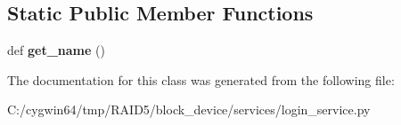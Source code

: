 \subsection*{Static Public Member Functions}
\begin{DoxyCompactItemize}
\item 
\mbox{\label{class_r_a_i_d5_1_1block__device_1_1services_1_1login__service_1_1_login_service_a8501e68a944ed20a107108801926b1be}} 
def {\bfseries get\+\_\+name} ()
\end{DoxyCompactItemize}


The documentation for this class was generated from the following file\+:\begin{DoxyCompactItemize}
\item 
C\+:/cygwin64/tmp/\+R\+A\+I\+D5/block\+\_\+device/services/login\+\_\+service.\+py\end{DoxyCompactItemize}
